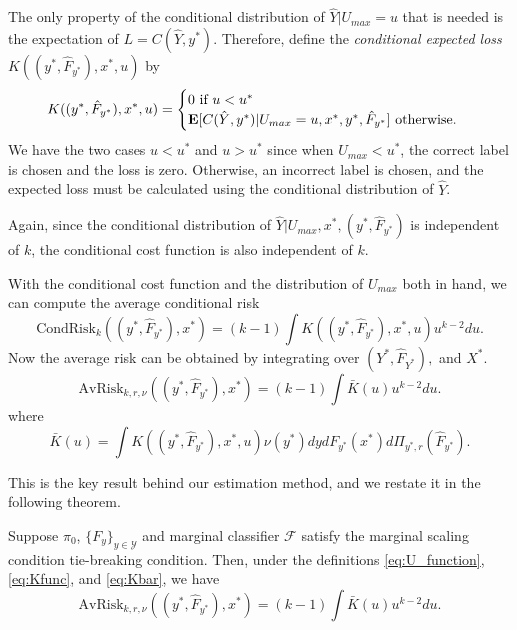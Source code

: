 \documentclass[12pt]{article}
\begin{document}
The only property of the conditional distribution of $\hat{Y}|U_{max} = u$ that is needed is
the expectation of $L = C(\hat{Y}, y^*)$.  Therefore, define the \emph{conditional expected loss} $K((y^*, \hat{F}_{y^*}), x^*, u)$ by
\begin{equation}\label{eq:Kfunc}
K((y^*, \hat{F}_{y^*}), x^*, u) = \begin{cases} 0 \text{ if } u < u^*\\
\textbf{E}[C(\hat{Y}, y^*)|U_{max} = u, x^*, y^*, \hat{F}_{y^*}] \text{ otherwise.}
\end{cases}
\end{equation}
We have the two cases $u < u^*$ and $u > u^*$ since when $U_{max} <
u^*$, the correct label is chosen and the loss is zero.  Otherwise, an
incorrect label is chosen, and the expected loss must be calculated
using the conditional distribution of $\hat{Y}$.

Again, since the conditional distribution of $\hat{Y}|U_{max}, x^*,
(y^*, \hat{F}_{y^*})$ is independent of $k$, the conditional cost
function is also independent of $k$.

With the conditional cost function and the distribution of $U_{max}$ both in hand, we can compute the average conditional risk
\[
\text{CondRisk}_k((y^*, \hat{F}_{y^*}), x^*) = (k-1) \int K((y^*,\hat{F}_{y^*}), x^*, u) u^{k-2} du.
\]
Now the average risk can be obtained by integrating over $(Y^*, \hat{F}_{Y^*}),$ and $X^*$.
\[
\text{AvRisk}_{k, r, \nu}((y^*, \hat{F}_{y^*}), x^*) = (k-1) \int \bar{K}(u) u^{k-2} du.
\]
where
\begin{equation}\label{eq:Kbar}
\bar{K}(u) = \int K((y^*,\hat{F}_{y^*}), x^*, u) \nu(y^*)dy dF_{y^*}(x^*) d\Pi_{y^*, r}(\hat{F}_{y^*}).
\end{equation}


This is the key result behind our estimation method, and we restate it
in the following theorem.

\begin{theorem}\label{theorem:avrisk_identity}
Suppose $\pi_0$, $\{F_y\}_{y \in \mathcal{Y}}$ and marginal classifier
$\mathcal{F}$ satisfy the marginal scaling condition tie-breaking
condition.  Then, under the
definitions \eqref{eq:U_function}, \eqref{eq:Kfunc},
and \eqref{eq:Kbar}, we have
\begin{equation}\label{eq:avrisk_identity}
\text{AvRisk}_{k, r, \nu}((y^*, \hat{F}_{y^*}), x^*) = (k-1) \int \bar{K}(u) u^{k-2} du.
\end{equation}
\end{theorem}
\end{document}

